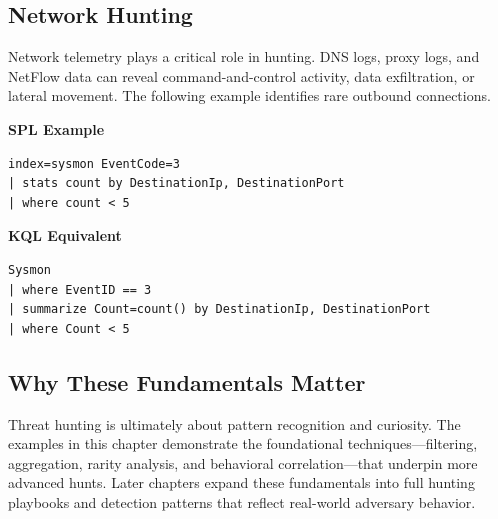 \subsection*{Network Hunting}

Network telemetry plays a critical role in hunting. DNS logs, proxy logs, and NetFlow data can reveal command-and-control 
activity, data exfiltration, or lateral movement. The following example identifies rare outbound connections.

\textbf{SPL Example}

\begin{lstlisting}
index=sysmon EventCode=3
| stats count by DestinationIp, DestinationPort
| where count < 5
\end{lstlisting}

\textbf{KQL Equivalent}

\begin{lstlisting}
Sysmon
| where EventID == 3
| summarize Count=count() by DestinationIp, DestinationPort
| where Count < 5
\end{lstlisting}


\subsection*{Why These Fundamentals Matter}

Threat hunting is ultimately about pattern recognition and curiosity. The examples in this chapter demonstrate the 
foundational techniques—filtering, aggregation, rarity analysis, and behavioral correlation—that underpin more advanced 
hunts. Later chapters expand these fundamentals into full hunting playbooks and detection patterns that reflect real-world 
adversary behavior.
